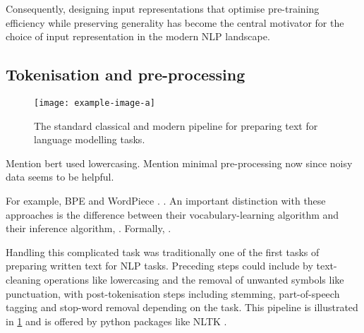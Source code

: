 Consequently, designing input representations that optimise pre-training efficiency while preserving generality has become the central motivator for the choice of input representation in the modern NLP landscape. 



\subsection{Tokenisation and pre-processing}\label{sec:12-tokenisation}

\begin{figure}[t]
    \centering
    \texttt{[image: example-image-a]}
    \caption{The standard classical and modern pipeline for preparing text for language modelling tasks.}
    \label{fig:12-pipelinecomparison}
\end{figure}

Mention bert used lowercasing. Mention minimal pre-processing now since noisy data seems to be helpful. 

For example, BPE and WordPiece \addcites. \writemore. An important distinction with these approaches is the difference between their vocabulary-learning algorithm and their inference algorithm, \writemore. Formally, \writemore. 

Handling this complicated task was traditionally one of the first tasks of preparing written text for NLP tasks. Preceding steps could include by text-cleaning operations like lowercasing and the removal of unwanted symbols like punctuation, with post-tokenisation steps including stemming, part-of-speech tagging and stop-word removal depending on the task. This pipeline is illustrated in \cref{fig:12-pipelinecomparison} and is offered by python packages like NLTK \addcites.

